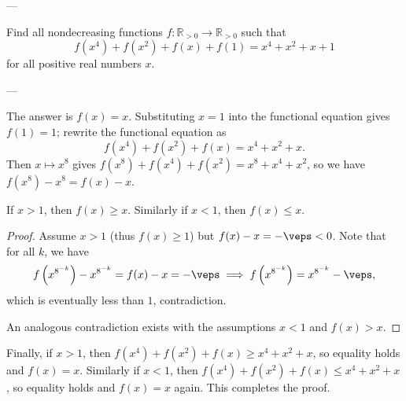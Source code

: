 
---

Find all nondecreasing functions $f:\mathbb R_{>0}\to\mathbb R_{>0}$ such that \[f(x^4)+f(x^2)+f(x)+f(1)=x^4+x^2+x+1\]
for all positive real numbers $x$. %

---

The answer is $f(x)=x$. Substituting $x=1$ into the functional equation gives $f(1)=1$; rewrite the functional equation as \[f(x^4)+f(x^2)+f(x)=x^4+x^2+x.\]
Then $x\mapsto x^8$ gives $f(x^8)+f(x^4)+f(x^2)=x^8+x^4+x^2$, so we have $f(x^8)-x^8=f(x)-x$.
\begin{iclaim*}
    If $x>1$, then $f(x)\ge x$. Similarly if $x<1$, then $f(x)\le x$.
\end{iclaim*}
\begin{proof}
    Assume $x>1$ (thus $f(x)\ge1$) but $f(x)-x=-\veps<0$. Note that for all $k$, we have \[f\left(x^{8^{-k}}\right)-x^{8^{-k}}=f(x)-x=-\veps\implies f\left(x^{8^{-k}}\right)=x^{8^{-k}}-\veps,\]
    which is eventually less than $1$, contradiction.

    An analogous contradiction exists with the assumptions $x<1$ and $f(x)>x$.
\end{proof}

Finally, if $x>1$, then $f(x^4)+f(x^2)+f(x)\ge x^4+x^2+x$, so equality holds and $f(x)=x$. Similarly if $x<1$, then $f(x^4)+f(x^2)+f(x)\le x^4+x^2+x$, so equality holds and $f(x)=x$ again. This completes the proof.

